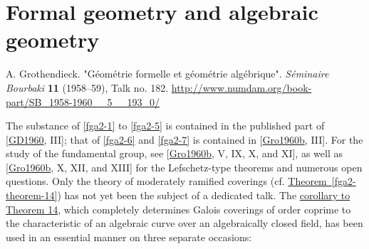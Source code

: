 \part{Formal geometry and algebraic geometry}\label{fga2}\thispagestyle{fancy}\begin{original}{}\label{fga2-original-citation}\skipsinglepar\par{}A. Grothendieck.
    "Géométrie formelle et géométrie algébrique".
    \emph{Séminaire Bourbaki} \textbf{11} (1958–59), Talk no. 182.
    \url{http://www.numdam.org/book-part/SB_1958-1960__5__193_0/}\end{original}\par{}The substance of \cref{fga2-1} to \cref{fga2-5} is contained in the published part of [\hyperref[GD1960]{GD1960}, III];
  that of \cref{fga2-6} and \cref{fga2-7} is contained in [\hyperref[Gro1960b]{Gro1960b}, III].
  For the study of the fundamental group, see [\hyperref[Gro1960b]{Gro1960b}, V, IX, X, and XI], as well as [\hyperref[Gro1960b]{Gro1960b}, X, XII, and XIII] for the Lefschetz-type theorems and numerous open questions.
  Only the theory of moderately ramified coverings (cf. \hyperref[fga2-theorem-14]{Theorem~\ref*{fga2-theorem-14}}) has not yet been the subject of a dedicated talk.
  The \hyperref[fga2-theorem-14-corollary-1]{corollary to Theorem 14}, which completely determines Galois coverings of order coprime to the characteristic of an algebraic curve over an algebraically closed field, has been used in an essential manner on three separate occasions:

